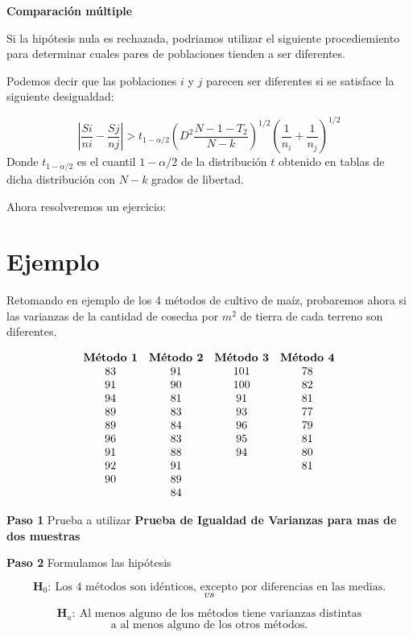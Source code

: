 \documentclass[
  a4paper,
  oneside,
  openany]{book}
\begin{document}
\textbf{Comparación múltiple}

Si la hipótesis nula es rechazada, podriamos utilizar el siguiente procediemiento para determinar cuales pares de poblaciones tienden a ser diferentes.

Podemos decir que las poblaciones \(i\) y \(j\) parecen ser diferentes si se satisface la siguiente desigualdad:

\[\left|\frac{Si}{ni}- \frac{Sj}{nj}\right|> t_{1-\alpha/2}\left(D^2\frac{N-1-T_{2}}{N-k}\right)^{1/2}\left(\frac{1}{n_i}+\frac{1}{n_j}\right)^{1/2}\]
Donde \(t_{1-\alpha/2}\) es el cuantil \(1-\alpha/2\) de la distribución \(t\) obtenido en tablas de dicha distribución con \(N-k\) grados de libertad.

Ahora resolveremos un ejercicio:

\hypertarget{ejemplo-8}{%
\section{Ejemplo}\label{ejemplo-8}}

Retomando en ejemplo de los 4 métodos de cultivo de maíz, probaremos ahora si las varianzas de la cantidad de cosecha por \(m^2\) de tierra de cada terreno son diferentes.

\[
\begin{array}{c c c c} 
\textbf{Método 1} & \textbf{Método 2} & \textbf{Método 3} & \textbf{Método 4}\\
83&91&101&78\\
91&90&100&82\\
94&81&91&81\\
89&83&93&77\\
89&84&96&79\\
96&83&95&81\\
91&88&94&80\\
92&91&  &81\\
90&89&  &\\
  &84&  &\\
\end{array}
\]

\textbf{Paso 1} Prueba a utilizar \textbf{Prueba de Igualdad de Varianzas para mas de dos muestras}

\textbf{Paso 2} Formulamos las hipótesis

\[\textbf{H}_0: \ \mbox{Los 4 métodos son idénticos, excepto por diferencias en las medias.}\]
\[vs\]

\[\textbf{H}_a:\ \mbox{Al menos alguno de los métodos tiene varianzas distintas}\]
\[\mbox{a al menos alguno de los otros métodos.}\]
\end{document}
